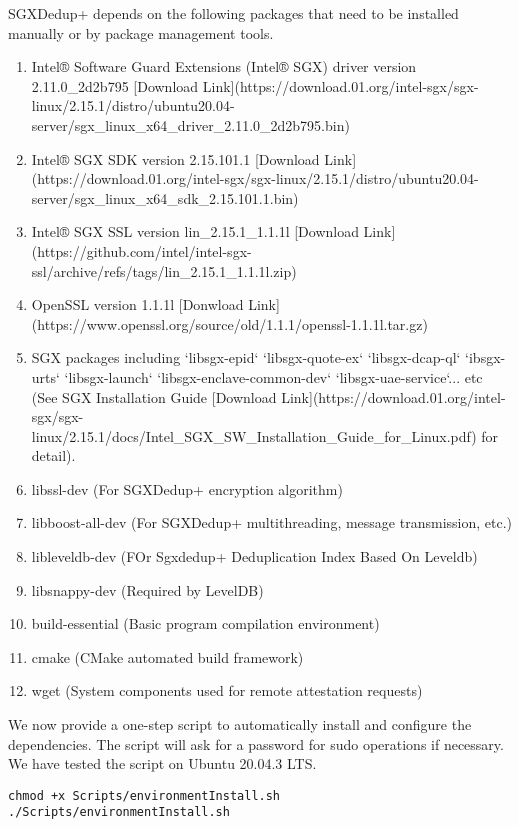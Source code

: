 SGXDedup+ depends on the following packages that need to be installed manually or by package management tools.
\begin{enumerate}[leftmargin=*]
    \item Intel® Software Guard Extensions (Intel® SGX) driver version 2.11.0\_2d2b795 [Download Link](https://download.01.org/intel-sgx/sgx-linux/2.15.1/distro/ubuntu20.04-server/sgx\_linux\_x64\_driver\_2.11.0\_2d2b795.bin)
    \item Intel® SGX SDK version 2.15.101.1 [Download Link](https://download.01.org/intel-sgx/sgx-linux/2.15.1/distro/ubuntu20.04-server/sgx\_linux\_x64\_sdk\_2.15.101.1.bin)
    \item Intel® SGX SSL version lin\_2.15.1\_1.1.1l [Download Link](https://github.com/intel/intel-sgx-ssl/archive/refs/tags/lin\_2.15.1\_1.1.1l.zip)
    \item OpenSSL version 1.1.1l [Donwload Link](https://www.openssl.org/source/old/1.1.1/openssl-1.1.1l.tar.gz)
    \item SGX packages including `libsgx-epid` `libsgx-quote-ex` `libsgx-dcap-ql` `ibsgx-urts` `libsgx-launch` `libsgx-enclave-common-dev` `libsgx-uae-service`... etc (See SGX Installation Guide [Download Link](https://download.01.org/intel-sgx/sgx-linux/2.15.1/docs/Intel\_SGX\_SW\_Installation\_Guide\_for\_Linux.pdf) for detail).
    \item libssl-dev (For SGXDedup+ encryption algorithm)
    \item libboost-all-dev (For SGXDedup+ multithreading, message transmission, etc.)
    \item libleveldb-dev (FOr Sgxdedup+ Deduplication Index Based On Leveldb)
    \item libsnappy-dev (Required by LevelDB)
    \item build-essential (Basic program compilation environment)
    \item cmake (CMake automated build framework)
    \item wget (System components used for remote attestation requests)
\end{enumerate}

We now provide a one-step script to automatically install and configure the dependencies. The script will ask for a password for sudo operations if necessary. We have tested the script on Ubuntu 20.04.3 LTS.

\begin{lstlisting}[style=shell]
chmod +x Scripts/environmentInstall.sh
./Scripts/environmentInstall.sh
\end{lstlisting}

